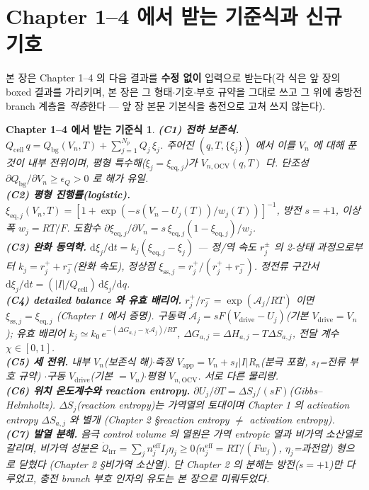 \documentclass[11pt,a4paper]{article}
\newtheorem*{inheritbox}{Chapter 1--4 에서 받는 기준식}
\newcommand{\dd}{\mathrm{d}}
\newcommand{\eff}{\mathrm{eff}}
\newcommand{\eq}{\mathrm{eq}}
\newcommand{\app}{\mathrm{app}}
\newcommand{\drive}{\mathrm{drive}}
\newcommand{\cell}{\mathrm{cell}}
\newcommand{\bg}{\mathrm{bg}}
\newcommand{\OCV}{\mathrm{OCV}}
\newcommand{\sstat}{\mathrm{ss}}
\newcommand{\irr}{\mathrm{irr}}
\begin{document}
\section{Chapter 1--4 에서 받는 기준식과 신규 기호}\label{sec:ch5_inherit}
본 장은 Chapter 1--4 의 다음 결과를 \textbf{수정 없이} 입력으로 받는다(각 식은 앞 장의 boxed 결과를 가리키며,
본 장은 그 형태$\cdot$기호$\cdot$부호 규약을 그대로 쓰고 그 위에 충방전 branch 계층을 \emph{적층}한다 — 앞 장
본문 기본식을 충전으로 고쳐 쓰지 않는다).
\begin{inheritbox}
\textbf{(C1) 전하 보존식.} $Q_\cell\,q=Q_\bg(V_n,T)+\sum_{j=1}^{N_p}Q_j\,\xi_j$. 주어진 $(q,T,\{\xi_j\})$ 에서
이를 $V_n$ 에 대해 푼 것이 내부 전위이며, 평형 특수해($\xi_j=\xi_{\eq,j}$)가 $V_{n,\OCV}(q,T)$ 다. 단조성
$\partial Q_\bg/\partial V_n\ge\epsilon_Q>0$ 로 해가 유일.\\
\textbf{(C2) 평형 진행률(logistic).} $\xi_{\eq,j}(V_n,T)=[1+\exp(-s(V_n-U_j(T))/w_j(T))]^{-1}$, 방전 $s=+1$,
이상 폭 $w_j=RT/F$. 도함수 $\partial\xi_{\eq,j}/\partial V_n=s\,\xi_{\eq,j}(1-\xi_{\eq,j})/w_j$.\\
\textbf{(C3) 완화 동역학.} $\dd\xi_j/\dd t=k_j(\xi_{\eq,j}-\xi_j)$ — 정/역 속도 $r_j^\pm$ 의 2-상태 과정으로부터
$k_j=r_j^++r_j^-$(완화 속도), 정상점 $\xi_{\sstat,j}=r_j^+/(r_j^++r_j^-)$. 정전류 구간서
$\dd\xi_j/\dd t=(|I|/Q_\cell)\,\dd\xi_j/\dd q$.\\
\textbf{(C4) detailed balance 와 유효 배리어.} $r_j^+/r_j^-=\exp(\mathcal A_j/RT)$ 이면 $\xi_{\sstat,j}=\xi_{\eq,j}$
(Chapter 1 에서 증명). 구동력 $\mathcal A_j=sF(V_\drive-U_j)$(기본 $V_\drive=V_n$); 유효 배리어
$k_j\simeq k_0\,e^{-(\Delta G_{a,j}-\chi\mathcal A_j)/RT}$, $\Delta G_{a,j}=\Delta H_{a,j}-T\Delta S_{a,j}$, 전달
계수 $\chi\in[0,1]$.\\
\textbf{(C5) 세 전위.} 내부 $V_n$(보존식 해)$\cdot$측정 $V_\app=V_n+s_I|I|R_n$(분극 포함, $s_I$=전류 부호 규약)
$\cdot$구동 $V_\drive$(기본 $=V_n$)$\cdot$평형 $V_{n,\OCV}$. \emph{서로 다른 물리량}.\\
\textbf{(C6) 위치 온도계수와 reaction entropy.} $\partial U_j/\partial T=\Delta S_j/(sF)$(Gibbs--Helmholtz).
$\Delta S_j$(reaction entropy)는 가역열의 토대이며 Chapter 1 의 activation entropy $\Delta S_{a,j}$ 와 별개
(Chapter 2 \S reaction entropy $\ne$ activation entropy).\\
\textbf{(C7) 발열 분해.} 음극 control volume 의 열원은 가역 entropic 열과 비가역 소산열로 갈리며, 비가역 성분은
$\dot{\mathcal Q}_\irr=\sum_j n_j^{\eff}I_j\eta_j\ge0$($n_j^{\eff}=RT/(Fw_j)$, $\eta_j$=과전압) 형으로 닫혔다
(Chapter 2 \S 비가역 소산열). 단 Chapter 2 의 분해는 방전($s=+1$)만 다루었고, 충전 branch 부호 인자의 유도는
본 장으로 미뤄두었다.
\end{inheritbox}
\end{document}

